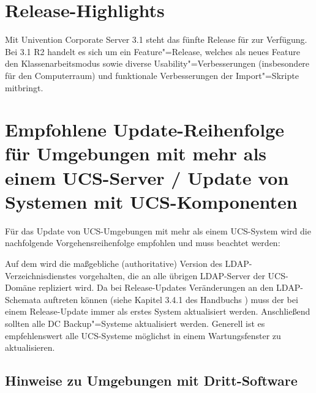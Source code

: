 


\newcommand{\ucsManualTitle}{UCS@school 3.1 R2 Release Notes}
\newcommand{\ucsManualSubtitle}{Release Notes für die Inbetriebnahme und
Aktualisierung von \ucsUAS{} 3.1 R2}
\newcommand{\ucsManualVersion}{3.1}
\newcommand{\ucsTechAuthor}{ & Univention GmbH & feedback@univention.de}
\newcommand{\ucsSVNVersion}{41030}

\setcounter{secnumdepth}{3}
\setcounter{tocdepth}{3}



\chapter{Release-Highlights}

Mit Univention Corporate Server 3.1 steht das fünfte Release für
\ucsUAS{} zur Verfügung. Bei \ucsUAS{} 3.1 R2 handelt es sich um ein Feature"=Release, welches als neues
Feature den Klassenarbeitsmodus sowie diverse Usability"=Verbesserungen (insbesondere für den Computerraum) und
funktionale Verbesserungen der Import"=Skripte mitbringt.

\chapter{Empfohlene Update-Reihenfolge für Umgebungen mit mehr als einem UCS-Server / Update von Systemen mit UCS-Komponenten}

Für das Update von UCS-Umgebungen mit mehr als einem UCS-System wird
die nachfolgende Vorgehensreihenfolge empfohlen und muss beachtet werden:

Auf dem \ucsMaster{} wird die maßgebliche (authoritative) Version des
LDAP-Verzeichnisdienstes vorgehalten, die an alle übrigen LDAP-Server
der UCS-Domäne repliziert wird. Da bei Release-Updates Veränderungen
an den LDAP-Schemata auftreten können (siehe
Kapitel 3.4.1 des Handbuchs \cite{UCS-Handbuch}) muss der \ucsMaster{} bei einem
Release-Update immer als erstes System aktualisiert werden. Anschließend sollten alle DC Backup"=Systeme
aktualisiert werden. Generell ist es empfehlenswert alle UCS-Systeme möglichst in einem
Wartungsfenster zu aktualisieren. 

\section{Hinweise zu Umgebungen mit Dritt-Software}

